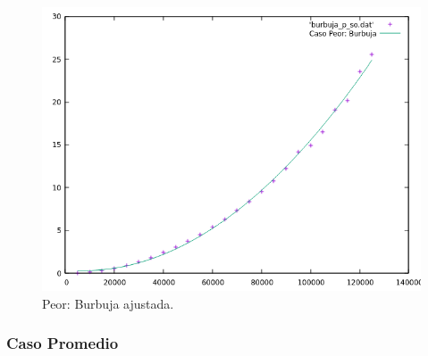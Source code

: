 \documentclass[a4paper,12pt,twoside]{article} %
\begin{document}
\begin{itemize}
\begin{figure}[h]
\begin{center}
  	\includegraphics[scale=0.8]{burbuja_p_so_a.png}
  	\caption{Peor: Burbuja ajustada.}
  	
  \end{center}
\end{figure}
		
		
	\end{itemize}
\newpage

	
	\subsubsection{Caso Promedio}
\end{document}
